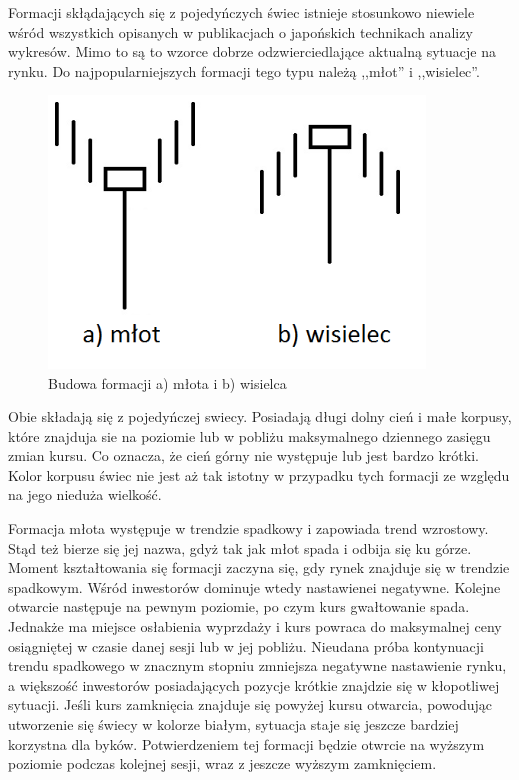 \documentclass[pdflatex,11pt]{aghdpl}
\begin{document}
Formacji skłądających się z pojedyńczych świec istnieje stosunkowo niewiele wśród wszystkich opisanych w publikacjach o japońskich technikach analizy wykresów. Mimo to są to wzorce dobrze odzwierciedlające aktualną sytuacje na rynku. Do najpopularniejszych formacji tego typu należą ,,młot'' i ,,wisielec''. 
\begin{figure}[ht]
\begin{center}
\includegraphics[width=10cm]{hammer.png}
\caption{Budowa formacji a) młota i b) wisielca}
\label{mlot}
\end{center}
\end{figure} 

Obie składają się z pojedyńczej swiecy. Posiadają długi dolny cień i małe korpusy, które znajduja sie na poziomie lub w pobliżu maksymalnego dziennego zasięgu zmian kursu. Co oznacza, że cień górny nie występuje lub jest bardzo krótki. Kolor korpusu świec nie jest aż tak istotny w przypadku tych formacji ze względu na jego nieduża wielkość.

Formacja młota występuje w trendzie spadkowy i zapowiada trend wzrostowy. Stąd też bierze się jej nazwa, gdyż tak jak młot spada i odbija się ku górze. Moment kształtowania się formacji zaczyna się, gdy rynek znajduje się w trendzie spadkowym. Wśród inwestorów dominuje wtedy nastawienei negatywne. Kolejne otwarcie następuje na pewnym poziomie, po czym kurs gwałtowanie spada. Jednakże ma miejsce osłabienia wyprzdaży i kurs powraca do maksymalnej ceny osiągniętej w czasie danej sesji lub w jej pobliżu. Nieudana próba kontynuacji trendu spadkowego w znacznym stopniu zmniejsza negatywne nastawienie rynku, a większość inwestorów posiadających pozycje krótkie znajdzie się w kłopotliwej sytuacji. Jeśli kurs zamknięcia znajduje się powyżej kursu otwarcia, powodując utworzenie się świecy w kolorze białym, sytuacja staje się jeszcze bardziej korzystna dla byków. Potwierdzeniem tej formacji będzie otwrcie na wyższym poziomie podczas kolejnej sesji, wraz z jeszcze wyższym zamknięciem.  
\end{document}
